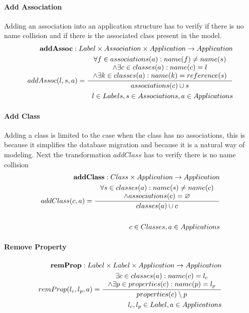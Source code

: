 \documentclass[11pt]{article}
\begin{document}
\paragraph{Add Association} Adding an association into an application structure has to verify if there is no name collision and if there is the associated class present in the model.
\begin{align*}
	\mathbf{addAssoc} : Label \times Association \times Application \rightarrow Application \\
	addAssoc(l, s, a) = \inference{\forall f \in associations(a) : name(f) \neq name(s) \\ \wedge \exists c \in classes(a) : name(c) = l \\ \wedge \exists k \in classes(a) : name(k) = reference(s) }{associations(c) \cup s}\\
	l \in Labels, s \in Associations, a \in Applications
\end{align*}
\paragraph{Add Class} Adding a class is limited to the case when the class has no associations, this is because it simplifies the database migration and because it is a natural way of modeling. Next the transformation $addClass$ has to verify there is no name collision
\begin{align*}
	\mathbf{addClass} : Class \times Application \rightarrow Application \\ 
	addClass(c, a) = \inference{\forall s \in classes(a) : name(s) \neq name(c) \\ \wedge associations(c) = \varnothing }{classes(a) \cup c} \\ \\
	c \in Classes, a \in Applications
\end{align*}
\paragraph{Remove Property}
\begin{align*}
 	\mathbf{remProp} : Label \times Label \times Application \rightarrow Application \\
 	remProp(l_c, l_p, a) = \inference{\exists c \in classes(a) : name(c) = l_c \\ \wedge \exists p \in properties(c) : name(p) = l_p
	}{properties(c) \setminus p }\\
	l_c, l_p \in Label, a \in Applications 
\end{align*}
\end{document}
